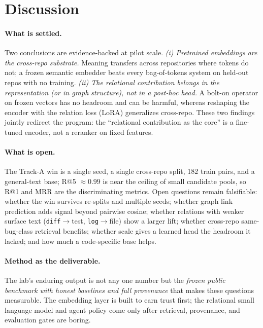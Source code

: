 \documentclass[11pt]{article}
\newcommand{\code}[1]{\texttt{#1}}
\begin{document}
\section{Discussion}
\label{sec:discussion}

\paragraph{What is settled.}
Two conclusions are evidence-backed at pilot scale.
\emph{(i) Pretrained embeddings are the cross-repo substrate.} Meaning transfers
across repositories where tokens do not; a frozen semantic embedder beats every
bag-of-tokens system on held-out repos with no training.
\emph{(ii) The relational contribution belongs in the representation (or in graph
structure), not in a post-hoc head.} A bolt-on operator on frozen vectors has no
headroom and can be harmful, whereas reshaping the encoder with the relation loss
(LoRA) generalizes cross-repo. These two findings jointly redirect the program: the
``relational contribution as the core'' is a fine-tuned encoder, not a reranker on
fixed features.

\paragraph{What is open.}
The Track-A win is a single seed, a single cross-repo split, 182 train pairs, and a
general-text base; R@5 $\approx 0.99$ is near the ceiling of small candidate pools, so
R@1 and MRR are the discriminating metrics. Open questions remain falsifiable:
whether the win survives re-splits and multiple seeds; whether graph link prediction
adds signal beyond pairwise cosine; whether relations with weaker surface text
(\code{diff}$\to$test, \code{log}$\to$file) show a larger lift; whether cross-repo
same-bug-class retrieval benefits; whether scale gives a learned head the headroom it
lacked; and how much a code-specific base helps.

\paragraph{Method as the deliverable.}
The lab's enduring output is not any one number but the \emph{frozen public benchmark
with honest baselines and full provenance} that makes these questions measurable. The
embedding layer is built to earn trust first; the relational small language model and
agent policy come only after retrieval, provenance, and evaluation gates are boring.
\end{document}
